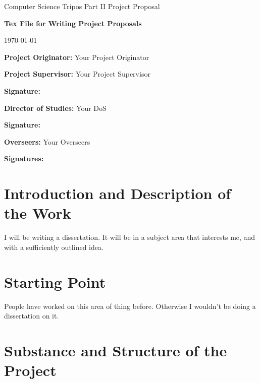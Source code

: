 \documentclass[a4paper,12pt]{article}
\begin{document}
\medskip
{}
\medskip
{}

\vfil

\centerline{\large Computer Science Tripos Part II Project Proposal}
\vspace{0.4in}
\centerline{\Large \textbf{Tex File for Writing Project Proposals}}
\vspace{0.3in}
\centerline{\large \today}

\vfil

\textbf{Project Originator:} Your Project Originator

\vspace{0.5in}

\textbf{Project Supervisor:} Your Project Supervisor

\vspace{0.2in}

{\bf Signature:}

\vspace{0.5in}

{\bf Director of Studies:} Your DoS

\vspace{0.2in}

{\bf Signature:}

\vspace{0.5in}

{\bf Overseers:} Your Overseers

\vspace{0.2in}

{\bf Signatures:}

\vfil
\eject

\section*{Introduction and Description of the Work}

I will be writing a dissertation. It will be in a subject area that interests me, and with a sufficiently outlined idea.

\section*{Starting Point}

People have worked on this area of thing before. Otherwise I wouldn't be doing a dissertation on it.

\section*{Substance and Structure of the Project}
\end{document}
